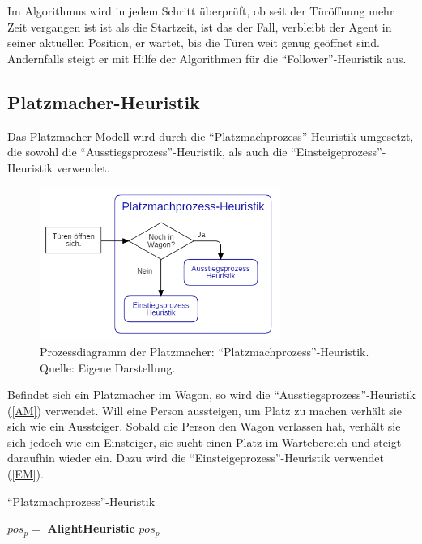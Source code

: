 Im Algorithmus wird in jedem Schritt überprüft, ob seit der Türöffnung mehr Zeit vergangen ist ist als die Startzeit, ist das der Fall, verbleibt der Agent in seiner aktuellen Position, er wartet, bis die Türen weit genug geöffnet sind. Andernfalls steigt er mit Hilfe der Algorithmen für die "`Follower"'-Heuristik aus.

\subsection{Platzmacher-Heuristik}
Das Platzmacher-Modell wird durch die "`Platzmachprozess"'-Heuristik umgesetzt, die sowohl die "`Ausstiegsprozess"'-Heuristik, als auch die "`Einsteigeprozess"'-Heuristik verwendet.
\begin{figure}[H]
	\centering
		\includegraphics[width=0.7\textwidth]{pictures/model/algorithm/spacemaker/spacemaker_heuristic.png}
	\caption{Prozessdiagramm der Platzmacher: "`Platzmachprozess"'-Heuristik. Quelle: Eigene Darstellung.}
	\label{fig:PH}
\end{figure}
Befindet sich ein Platzmacher im Wagon, so wird die "`Ausstiegsprozess"'-Heuristik (\ref{AM}) verwendet. Will eine Person aussteigen, um Platz zu machen verhält sie sich wie ein Aussteiger. Sobald die Person den Wagon verlassen hat, verhält sie sich jedoch wie ein Einsteiger, sie sucht einen Platz im Wartebereich und steigt daraufhin wieder ein. Dazu wird die "`Einsteigeprozess"'-Heuristik verwendet (\ref{EM}).

\begin{algorithm} [H]
	\caption{"`Platzmachprozess"'-Heuristik}
	
	\SpacemakerHeuristic{} {
		  {
			$pos_p = $ \textbf{AlightHeuristic}
		} 
		\Return $pos_p$
	}
\end{algorithm}

